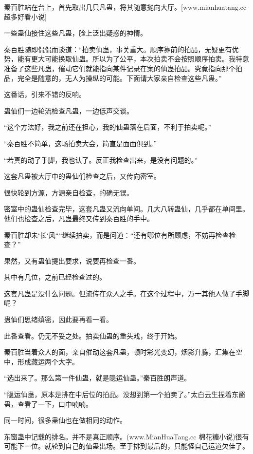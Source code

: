 
\begin{this_body}

秦百胜站在台上，首先取出几只凡蛊，将其随意抛向大厅。[www.mianhuatang.cc 超多好看小说]

一些蛊仙接住这些凡蛊，脸上泛出疑惑的神情。

秦百胜随即侃侃而谈道：“拍卖仙蛊，事关重大。顺序靠前的拍品，无疑更有优势，能有更大可能换取仙蛊。所以为了公平，本次拍卖不会按照顺序拍卖。我特意准备了这些凡蛊，催动它们就能指向某件记录在案的仙蛊拍品。究竟指向那个拍品，完全是随意的，无人为操纵的可能。下面请大家亲自检查这些凡蛊。”

这番话，引来不错的反响。

蛊仙们一边轮流检查凡蛊，一边低声交谈。

“这个方法好，我之前还在担心，我的仙蛊落在后面，不利于拍卖呢。”

“秦百胜不简单，这场拍卖大会，简直是面面俱到。”

“若真的动了手脚，我也认了。反正我检查出来，是没有问题的。”

这套凡蛊被大厅中的蛊仙们检查之后，又传向密室。

很快轮到方源，方源亲自检查，的确无误。

密室中的蛊仙检查完毕，这套凡蛊又流向单间。几大八转蛊仙，几乎都在单间里。他们也检查之后，凡蛊最终又传到秦百胜的手中。

秦百胜却未`长`风````继续拍卖，而是问道：“还有哪位有所顾虑，不妨再检查检查？”

果然，又有蛊仙提出要求，说要再检查一番。

其中有几位，之前已经检查过的。

这套凡蛊是没什么问题。但流传在众人之手。在这个过程中，万一其他人做了手脚呢？

蛊仙们思绪缜密，因此要再看一看。

此番查看。仍无不妥之处。拍卖仙蛊的重头戏，终于开始。

秦百胜当着众人的面，亲自催动这套凡蛊，顿时彩光变幻，烟影升腾，汇集在空中，形成藏运两个大字。

“选出来了。那么第一件仙蛊，就是隐运仙蛊。”秦百胜朗声道。

“隐运仙蛊，原本是排在中后位的拍品。没想到第一个拍卖了。”太白云生捏着东窗蛊，查看了一下，口中喃喃。

同一时间，很多蛊仙也在做相同的动作。

东窗蛊中记载的排名。并不是真正顺序。(www.MianHuaTang.cc 棉花糖小说)很有可能下一位。就轮到自己的仙蛊出场。至于排到最后的，只能怪自己运道欠佳了。


\end{this_body}

